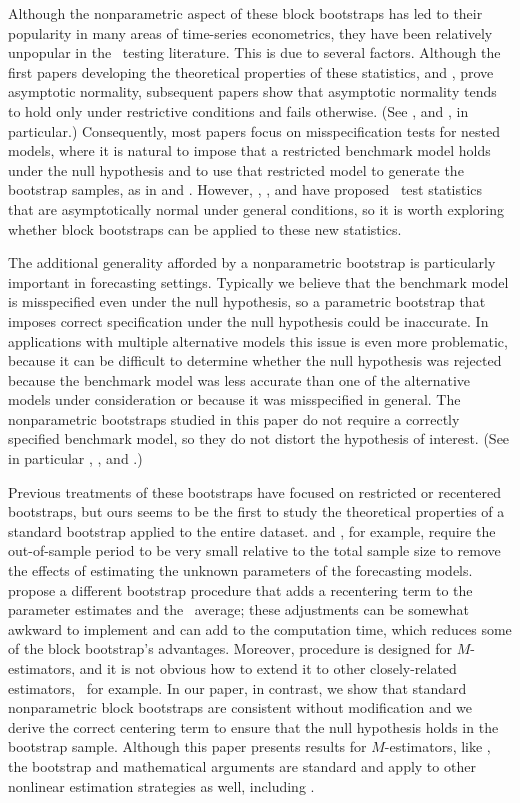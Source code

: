 \documentclass[12pt,fleqn]{article}
\begin{document}
Although the nonparametric aspect of these block bootstraps has led to
their popularity in many areas of time-series econometrics, they have
been relatively unpopular in the \oos\ testing literature. This is due
to several factors. Although the first papers developing the
theoretical properties of these statistics, \cite{DiM:95} and
\cite{Wes:96}, prove asymptotic normality, subsequent papers show that
asymptotic normality tends to hold only under restrictive conditions
and fails otherwise. (See \citealp{ClM:01}, and \citealp{Mcc:07}, in
particular.) Consequently, most papers focus on misspecification tests
for nested models, where it is natural to impose that a restricted
benchmark model holds under the null hypothesis and to use that
restricted model to generate the bootstrap samples, as in
\cite{Lut:99} and \cite{ClM:05}.
However, \cite{GiW:06}, \cite{ClW:06,ClW:07}, and \cite{Cal:15} have
proposed \oos\ test statistics that are asymptotically normal under
general conditions, so it is worth exploring whether block bootstraps
can be applied to these new statistics.

The additional generality afforded by a nonparametric bootstrap is
particularly important in forecasting settings. Typically we believe
that the benchmark model is misspecified even under the null
hypothesis, so a parametric bootstrap that imposes correct
specification under the null hypothesis could be inaccurate.  In
applications with multiple alternative models this issue is even more
problematic, because it can be difficult to determine whether the null
hypothesis was rejected because the benchmark model was less accurate
than one of the alternative models under consideration or because it
was misspecified in general. The nonparametric bootstraps studied in
this paper do not require a correctly specified benchmark model, so
they do not distort the hypothesis of interest.
(See in
particular \citealp{Whi:00}, \citealp{Han:05}, and \citealp{RoW:05}.)

Previous treatments of these bootstraps have focused on restricted or
recentered bootstraps, but ours seems to be the first to study the
theoretical properties of a standard bootstrap applied to the entire
dataset. \citet{Whi:00} and \citet{Han:05}, for example, require the
out-of-sample period to be very small relative to the total sample
size to remove the effects of estimating the unknown parameters of the
forecasting models. \cite{CoS:07} propose a different bootstrap
procedure that adds a recentering term to the parameter estimates and
the \oos\ average; these adjustments can be somewhat awkward to
implement and can add to the computation time, which reduces some of
the block bootstrap's advantages. Moreover,  procedure
is designed for $M$-estimators, and it is not obvious how to extend it
to other closely-related estimators, \gmm\ for example. In our paper,
in contrast, we show that standard nonparametric block bootstraps are
consistent without modification and we derive the correct centering
term to ensure that the null hypothesis holds in the bootstrap
sample. Although this paper presents results for $M$-estimators, like
, the bootstrap and mathematical arguments are
standard and apply to other nonlinear estimation strategies as well,
including \gmm.
\end{document}
